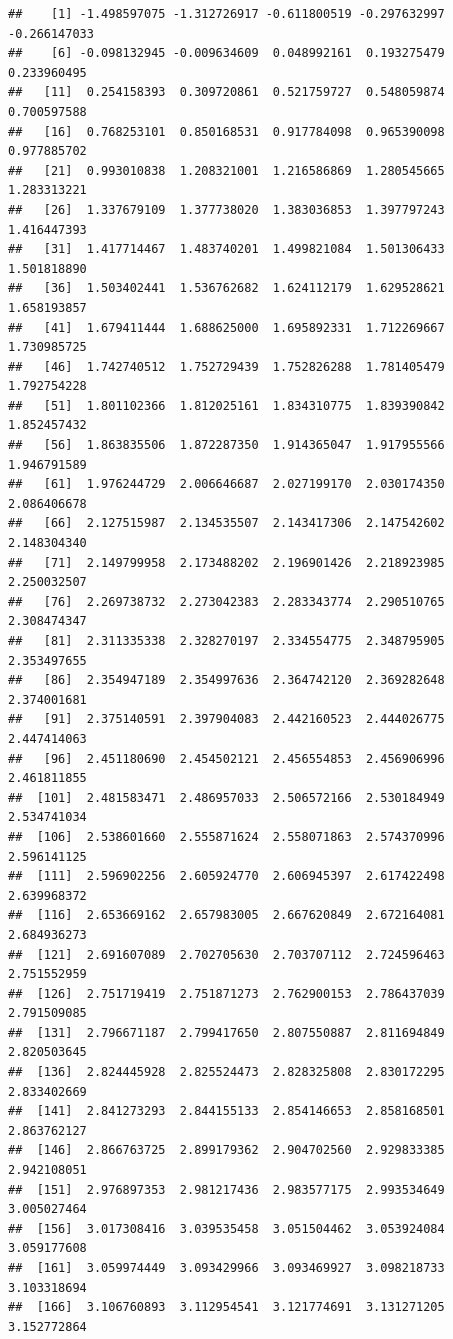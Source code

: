 \documentclass[
  11pt]{report}
\begin{document}
\begin{itemize}
\begin{verbatim}
##    [1] -1.498597075 -1.312726917 -0.611800519 -0.297632997 -0.266147033
##    [6] -0.098132945 -0.009634609  0.048992161  0.193275479  0.233960495
##   [11]  0.254158393  0.309720861  0.521759727  0.548059874  0.700597588
##   [16]  0.768253101  0.850168531  0.917784098  0.965390098  0.977885702
##   [21]  0.993010838  1.208321001  1.216586869  1.280545665  1.283313221
##   [26]  1.337679109  1.377738020  1.383036853  1.397797243  1.416447393
##   [31]  1.417714467  1.483740201  1.499821084  1.501306433  1.501818890
##   [36]  1.503402441  1.536762682  1.624112179  1.629528621  1.658193857
##   [41]  1.679411444  1.688625000  1.695892331  1.712269667  1.730985725
##   [46]  1.742740512  1.752729439  1.752826288  1.781405479  1.792754228
##   [51]  1.801102366  1.812025161  1.834310775  1.839390842  1.852457432
##   [56]  1.863835506  1.872287350  1.914365047  1.917955566  1.946791589
##   [61]  1.976244729  2.006646687  2.027199170  2.030174350  2.086406678
##   [66]  2.127515987  2.134535507  2.143417306  2.147542602  2.148304340
##   [71]  2.149799958  2.173488202  2.196901426  2.218923985  2.250032507
##   [76]  2.269738732  2.273042383  2.283343774  2.290510765  2.308474347
##   [81]  2.311335338  2.328270197  2.334554775  2.348795905  2.353497655
##   [86]  2.354947189  2.354997636  2.364742120  2.369282648  2.374001681
##   [91]  2.375140591  2.397904083  2.442160523  2.444026775  2.447414063
##   [96]  2.451180690  2.454502121  2.456554853  2.456906996  2.461811855
##  [101]  2.481583471  2.486957033  2.506572166  2.530184949  2.534741034
##  [106]  2.538601660  2.555871624  2.558071863  2.574370996  2.596141125
##  [111]  2.596902256  2.605924770  2.606945397  2.617422498  2.639968372
##  [116]  2.653669162  2.657983005  2.667620849  2.672164081  2.684936273
##  [121]  2.691607089  2.702705630  2.703707112  2.724596463  2.751552959
##  [126]  2.751719419  2.751871273  2.762900153  2.786437039  2.791509085
##  [131]  2.796671187  2.799417650  2.807550887  2.811694849  2.820503645
##  [136]  2.824445928  2.825524473  2.828325808  2.830172295  2.833402669
##  [141]  2.841273293  2.844155133  2.854146653  2.858168501  2.863762127
##  [146]  2.866763725  2.899179362  2.904702560  2.929833385  2.942108051
##  [151]  2.976897353  2.981217436  2.983577175  2.993534649  3.005027464
##  [156]  3.017308416  3.039535458  3.051504462  3.053924084  3.059177608
##  [161]  3.059974449  3.093429966  3.093469927  3.098218733  3.103318694
##  [166]  3.106760893  3.112954541  3.121774691  3.131271205  3.152772864

\end{verbatim}
\end{itemize}
\end{document}
